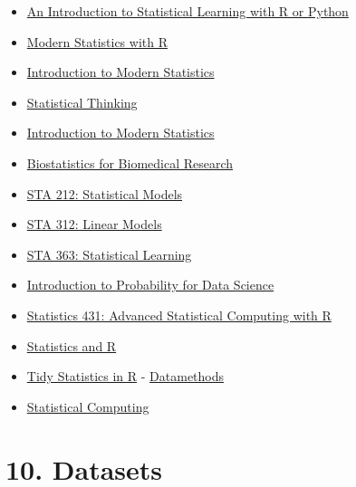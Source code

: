 \documentclass[
  letterpaper,
  DIV=11,
  numbers=noendperiod]{scrreprt}
\providecommand{\tightlist}{%
  \setlength{\itemsep}{0pt}\setlength{\parskip}{0pt}}\usepackage{longtable,booktabs,array}
\begin{document}
\begin{itemize}
\tightlist
\item
  \href{https://www.statlearning.com/}{An Introduction to Statistical
  Learning with R or Python}
\item
  \href{https://modernstatisticswithr.com/}{Modern Statistics with R}
\item
  \href{https://openintro-ims.netlify.app/index.html}{Introduction to
  Modern Statistics}
\item
  \href{https://www.fharrell.com/}{Statistical Thinking}
\item
  \href{https://openintro-ims.netlify.app/index.html}{Introduction to
  Modern Statistics}
\item
  \href{https://hbiostat.org/bbr/}{Biostatistics for Biomedical
  Research}
\item
  \href{https://sta-212-f19.lucymcgowan.com/}{STA 212: Statistical
  Models}
\item
  \href{https://sta-312-f20.netlify.app/}{STA 312: Linear Models}
\item
  \href{https://sta-363-s20.lucymcgowan.com/}{STA 363: Statistical
  Learning}
\item
  \href{https://probability4datascience.com/}{Introduction to
  Probability for Data Science}
\item
  \href{https://cal-poly-advanced-r.github.io/STAT-431/}{Statistics 431:
  Advanced Statistical Computing with R}
\item
  \href{https://tinystats.github.io/teacups-giraffes-and-statistics/index.html}{Statistics
  and R}
\item
  \href{https://themockup.blog/posts/2018-12-10-a-gentle-guide-to-tidy-statistics-in-r/}{Tidy
  Statistics in R} -
  \href{https://discourse.datamethods.org/}{Datamethods}
\item
  \href{https://www.stephaniehicks.com/jhustatcomputing2022/schedule}{Statistical
  Computing}
\end{itemize}

\section{10. Datasets}\label{datasets}
\end{document}
